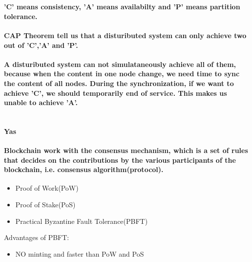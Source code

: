 \documentclass{article}
\begin{document}
    \section{}
            \paragraph{
                'C' means consistency, 'A' means availabilty and 'P' means partition tolerance. 
            }
            \paragraph{
                CAP Theorem tell us that a distuributed system can only achieve two out of 'C','A' and 'P'.  
            }
            \paragraph{
                A distuributed system can not simulataneously achieve all of them, because  when the content in one node change, we need time to sync the content of all nodes. During the synchronization, if we want to achieve 'C', we should temporarily end of service. This makes us unable to achieve 'A'.
            }
    \section{}
        \paragraph{
            Yas
        }
        \paragraph{
            Blockchain work with the consensus mechanism, which is a set of rules that decides on the contributions by the various participants of the blockchain, i.e. consensus algorithm(protocol).
        }

        \begin{itemize}
            \item Proof of Work(PoW)
            \item Proof of Stake(PoS)
            \item Practical Byzantine Fault Tolerance(PBFT)
        \end{itemize}

        Advantages of PBFT:
        \begin{itemize}
            \item NO minting and faster than PoW and PoS
        \end{itemize}
\end{document}
